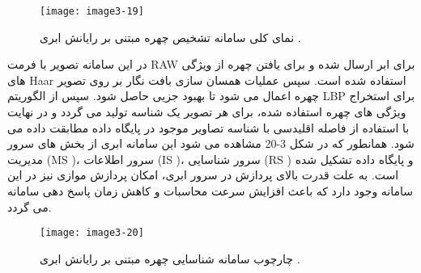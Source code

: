  \begin{figure}[h]
\centering
  \texttt{[image: image3-19]}
  \caption{نمای کلی سامانه تشخیص چهره مبتنی بر رایانش ابری \cite{ref1}.}
  \label{image2-1}
\end{figure}
\noindent
در این سامانه تصویر با فرمت RAW برای ابر ارسال شده و برای یافتن چهره از ویژگی های Haar استفاده شده است. سپس عملیات همسان سازی بافت نگار بر روی تصویر چهره اعمال می شود تا بهبود جزیی حاصل شود. سپس از الگوریتم LBP  برای استخراج ویژگی های چهره استفاده شده، برای هر تصویر یک شناسه تولید می گردد و در نهایت با استفاده از فاصله اقلیدسی با شناسه تصاویر موجود در پایگاه داده مطابقت داده می شود. همانطور که در شکل 3-20 مشاهده می شود این سامانه ابری از بخش های سرور مدیریت (MS )، سرور اطلاعات (IS )، سرور شناسایی (RS ) و پایگاه داده تشکیل شده است. به علت قدرت بالای پردازش در سرور ابری، امکان پردازش موازی نیز در این سامانه وجود دارد که باعث افزایش سرعت محاسبات و کاهش زمان پاسخ دهی سامانه می گردد. 
 \begin{figure}[h]
\centering
  \texttt{[image: image3-20]}
  \caption{چارچوب سامانه شناسایی چهره مبتنی بر رایانش ابری \cite{ref1}.}
  \label{image2-1}
\end{figure}

